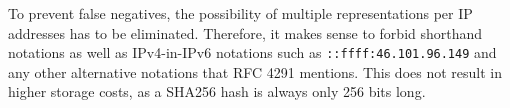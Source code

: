 To prevent false negatives, the possibility of multiple representations per IP addresses has to be eliminated. Therefore, it makes sense to forbid shorthand notations as well as IPv4-in-IPv6 notations such as \texttt{::ffff:46.101.96.149} and any other alternative notations that RFC 4291 \cite{RFC4291I66} mentions.
This does not result in higher storage costs, as a SHA256 hash is always only 256 bits long.

